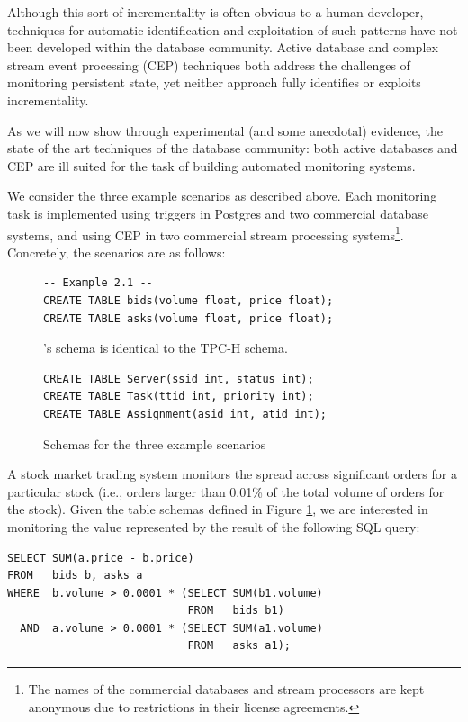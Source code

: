 Although this sort of incrementality is often obvious to a human developer, techniques for automatic identification and exploitation of such patterns have not been developed within the database community.  Active database \cite{morgenstern1983active} and complex stream event processing (CEP)\cite{?} techniques both address the challenges of monitoring persistent state, yet neither approach fully identifies or exploits incrementality.

As we will now show through experimental (and some anecdotal) evidence, the state of the art techniques of the database community: both active databases and CEP are ill suited for the task of building automated monitoring systems.

We consider the three example scenarios as described above.  Each monitoring task is implemented using triggers in Postgres and two commercial database systems, and using CEP in two commercial stream processing systems\footnote{The names of the commercial databases and stream processors are kept anonymous due to restrictions in their license agreements.}.  Concretely, the scenarios are as follows:

\begin{figure}
\begin{verbatim}
-- Example 2.1 --
CREATE TABLE bids(volume float, price float);
CREATE TABLE asks(volume float, price float);
\end{verbatim}

's schema is identical to the TPC-H schema\cite{tpch}.

\begin{verbatim}
CREATE TABLE Server(ssid int, status int);
CREATE TABLE Task(ttid int, priority int);
CREATE TABLE Assignment(asid int, atid int);
\end{verbatim}

\label{fig:dbfail:schemas}
\caption{Schemas for the three example scenarios}
\end{figure}

\begin{example}
\label{ex:dbfail:stock}
A stock market trading system monitors the spread across significant orders for a particular stock (i.e., orders larger than 0.01\% of the total volume of orders for the stock).  Given the table schemas defined in Figure \ref{fig:dbfail:schemas}, we are interested in monitoring the value represented by the result of the following SQL query:
\begin{verbatim}
SELECT SUM(a.price - b.price)
FROM   bids b, asks a
WHERE  b.volume > 0.0001 * (SELECT SUM(b1.volume) 
                            FROM   bids b1)
  AND  a.volume > 0.0001 * (SELECT SUM(a1.volume) 
                            FROM   asks a1);
\end{verbatim}

\end{example}

